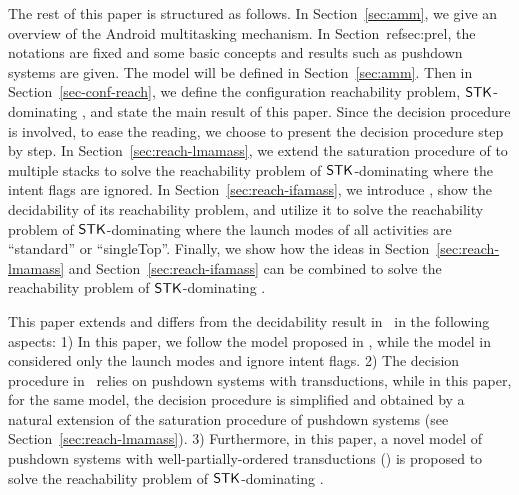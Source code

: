 The rest of this paper is structured as follows. In Section~\ref{sec:amm}, we give an overview of the Android multitasking mechanism.  
In Section~ref{sec:prel}, the notations are fixed and some basic concepts and results such as pushdown systems are given. 
The {\AMASS} model will be defined in Section~\ref{sec:amm}. Then in Section~\ref{sec-conf-reach}, we define the configuration reachability problem, $\mathsf{STK}$-dominating {\AMASS}, and state the main result of this paper. Since the decision procedure is involved, to ease the reading, we choose to present the decision procedure step by step. In Section~\ref{sec:reach-lmamass}, we extend the saturation procedure of {\PDS} to multiple stacks to solve the reachability problem of $\mathsf{STK}$-dominating {\AMASS} where the intent flags are ignored. 
In Section~\ref{sec:reach-ifamass}, we introduce {\WOTrPDS}, show the decidability of its reachability problem, and utilize it to solve the reachability problem of $\mathsf{STK}$-dominating {\AMASS} where the launch modes of all activities are ``standard'' or ``singleTop''. Finally, we show how the ideas in Section~\ref{sec:reach-lmamass} and Section~\ref{sec:reach-ifamass} can be combined to solve the reachability problem of $\mathsf{STK}$-dominating {\AMASS}. 

This paper extends and differs from the decidability result in~\cite{CHS+18} in the following aspects: 1) In this paper, we follow the {\AMASS} model proposed in \cite{HC+19}, while the model in~\cite{CHS+18} considered only the launch modes and ignore intent flags. 2) The decision procedure in~\cite{CHS+18} relies on pushdown systems with transductions, while in this paper, for the same model, the decision procedure is simplified and obtained by a natural extension of the saturation procedure of pushdown systems (see Section~\ref{sec:reach-lmamass}). 3) Furthermore, in this paper, a novel model of pushdown systems with well-partially-ordered transductions (\WOTrPDS) is proposed to solve the reachability problem of $\mathsf{STK}$-dominating {\AMASS}.  
